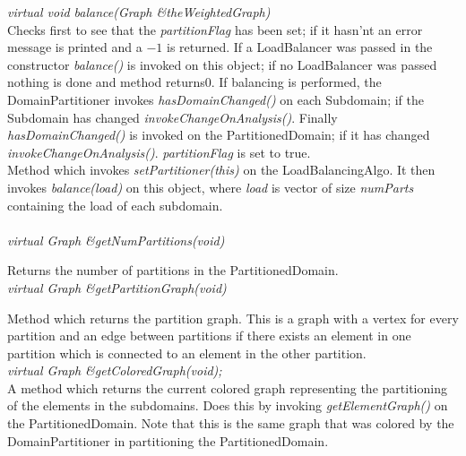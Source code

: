 {\em virtual void balance(Graph \&theWeightedGraph)} \\
Checks first to see that the {\em partitionFlag} has been set; if it
hasn'nt an error message is printed and a $-1$ is returned. If a
LoadBalancer was passed in the constructor {\em balance()} is invoked
on this object; if no LoadBalancer was passed nothing is done and
method returns$0$. If balancing is performed, the DomainPartitioner
invokes {\em hasDomainChanged()} on each Subdomain; if the Subdomain
has changed {\em invokeChangeOnAnalysis()}. Finally {\em
hasDomainChanged()} is invoked on the PartitionedDomain; if it has
changed {\em invokeChangeOnAnalysis()}. {\em partitionFlag} is set to
true. \\ 

Method which invokes {\em setPartitioner(this)} on the
LoadBalancingAlgo. It then invokes {\em balance(load)} on this
object, where {\em load} is vector of size {\em numParts}
containing the load of each subdomain. \\ 

  \\
{\em virtual Graph \&getNumPartitions(void)} 

Returns the number of partitions in the PartitionedDomain. \\

{\em virtual Graph \&getPartitionGraph(void)} 

Method which returns the partition graph. This is a graph with a
vertex for every partition and an edge between partitions if there
exists an element in one partition which is connected to an element
in the other partition. \\

{\em virtual Graph \&getColoredGraph(void); } \\
A method which returns the current colored graph representing the
partitioning of the elements in the subdomains. Does this by invoking
{\em getElementGraph()} on the PartitionedDomain. Note that this is
the same graph that was colored by the DomainPartitioner in
partitioning the PartitionedDomain. \\ 

